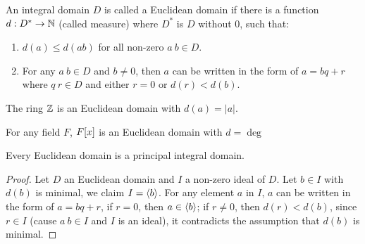 \documentclass[../main.tex]{subfiles}
\begin{document}
\begin{definition}
  An integral domain $D$ is called a Euclidean domain if there is a function
  $d : D^* \rightarrow \mathbb{N}$ (called measure) where $D^*$ is $D$ without $0$,
  such that:
  \begin{enumerate}
    \item $d(a) \leq d(ab)$ for all non-zero $a \ b \in D$.
    \item For any $a \ b \in D$ and $b \neq 0$, then $a$ can be written in the
          form of $a = bq + r$ where $q \ r \in D$ and 
          either $r = 0$ or $d(r) < d(b)$.
  \end{enumerate}
\end{definition}

\begin{example}
  The ring $\mathbb{Z}$ is an Euclidean domain with $d(a) = |a|$.
\end{example}

\begin{example}
  For any field $F$, $F[x]$ is an Euclidean domain with $d = \deg$
\end{example}

\begin{theorem}
  Every Euclidean domain is a principal integral domain.
\end{theorem}
\begin{proof}
  Let $D$ an Euclidean domain and $I$ a non-zero ideal of $D$.
  Let $b \in I$ with $d(b)$ is minimal, we claim $I = \langle b \rangle$.
  For any element $a$ in $I$, $a$ can be written in the form of $a = bq + r$,
  if $r = 0$, then $a \in \langle b \rangle$; if $r \neq 0$, then $d(r) < d(b)$,
  since $r \in I$ (cause $a \ b \in I$ and $I$ is an ideal), it contradicts the
  assumption that $d(b)$ is minimal.
\end{proof}
\end{document}
